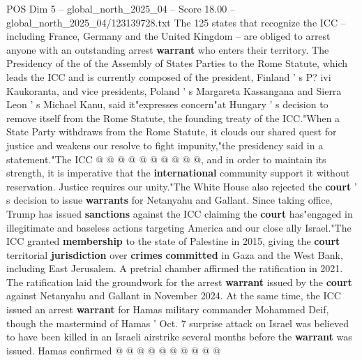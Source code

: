 \begin{textsample}{POS Dim 5 – global\_north\_2025\_04 – Score 18.00 – global\_north\_2025\_04/123139728.txt}
The 125 states that recognize the ICC -- including France, Germany and the United Kingdom -- are obliged to arrest anyone with an outstanding arrest \textbf{warrant} who enters their territory.
The Presidency of the of the Assembly of States Parties to the Rome Statute, which leads the ICC and is currently composed of the president, Finland ' s P? ivi Kaukoranta, and vice presidents, Poland ' s Margareta Kassangana and Sierra Leon ' s Michael Kanu, said it"expresses concern"at Hungary ' s decision to remove itself from the Rome Statute, the founding treaty of the ICC."When a State Party withdraws from the Rome Statute, it clouds our shared quest for justice and weakens our resolve to fight impunity,"the presidency said in a statement."The ICC @ @ @ @ @ @ @ @ @ @, and in order to maintain its strength, it is imperative that the \textbf{international} community support it without reservation.
Justice requires our unity."The White House also rejected the \textbf{court} ' s decision to issue \textbf{warrants} for Netanyahu and Gallant.
Since taking office, Trump has issued \textbf{sanctions} against the ICC claiming the \textbf{court} has"engaged in illegitimate and baseless actions targeting America and our close ally Israel."The ICC granted \textbf{membership} to the state of Palestine in 2015, giving the \textbf{court} territorial \textbf{jurisdiction} over \textbf{crimes} \textbf{committed} in Gaza and the West Bank, including East Jerusalem.
A pretrial chamber affirmed the ratification in 2021.
The ratification laid the groundwork for the arrest \textbf{warrant} issued by the \textbf{court} against Netanyahu and Gallant in November 2024.
At the same time, the ICC issued an arrest \textbf{warrant} for Hamas military commander Mohammed Deif, though the mastermind of Hamas ' Oct. 7 surprise attack on Israel was believed to have been killed in an Israeli airstrike several months before the \textbf{warrant} was issued.
Hamas confirmed @ @ @ @ @ @ @ @ @ @

\end{textsample}
